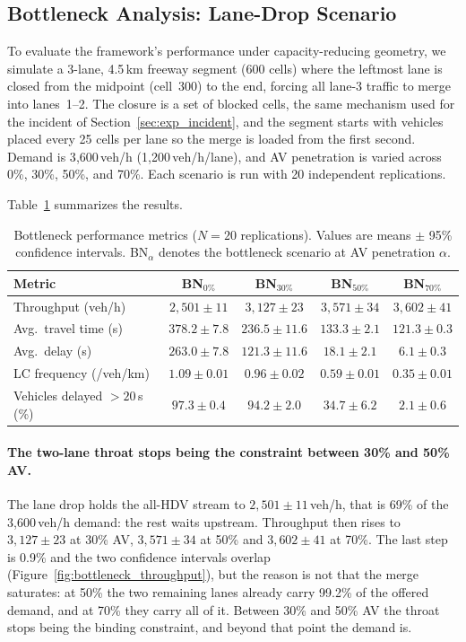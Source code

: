 \documentclass[review,authoryear]{elsarticle}
\begin{document}
\subsection{Bottleneck Analysis: Lane-Drop Scenario}
\label{sec:exp_bottleneck}

To evaluate the framework's performance under capacity-reducing geometry, we simulate a 3-lane, 4.5\,km freeway segment (600 cells) where the leftmost lane is closed from the midpoint (cell~300) to the end, forcing all lane-3 traffic to merge into lanes~1--2. The closure is a set of blocked cells, the same mechanism used for the incident of Section~\ref{sec:exp_incident}, and the segment starts with vehicles placed every 25 cells per lane so the merge is loaded from the first second. Demand is 3{,}600\,veh/h (1{,}200\,veh/h/lane), and AV penetration is varied across 0\%, 30\%, 50\%, and 70\%. Each scenario is run with 20 independent replications.

Table~\ref{tab:results_bottleneck} summarizes the results.

\begin{table}[ht]
\centering
\caption{Bottleneck performance metrics ($N = 20$ replications). Values are means $\pm$ 95\% confidence intervals. BN$_\alpha$ denotes the bottleneck scenario at AV penetration $\alpha$.}
\label{tab:results_bottleneck}
\begin{tabular}{@{}lcccc@{}}
\toprule
Metric & BN$_{0\%}$ & BN$_{30\%}$ & BN$_{50\%}$ & BN$_{70\%}$ \\
\midrule
Throughput (veh/h) & $2{,}501 \pm 11$ & $3{,}127 \pm 23$ & $3{,}571 \pm 34$ & $3{,}602 \pm 41$ \\
Avg.\ travel time (s) & $378.2 \pm 7.8$ & $236.5 \pm 11.6$ & $133.3 \pm 2.1$ & $121.3 \pm 0.3$ \\
Avg.\ delay (s) & $263.0 \pm 7.8$ & $121.3 \pm 11.6$ & $18.1 \pm 2.1$ & $6.1 \pm 0.3$ \\
LC frequency (/veh/km) & $1.09 \pm 0.01$ & $0.96 \pm 0.02$ & $0.59 \pm 0.01$ & $0.35 \pm 0.01$ \\
Vehicles delayed $>20$\,s (\%) & $97.3 \pm 0.4$ & $94.2 \pm 2.0$ & $34.7 \pm 6.2$ & $2.1 \pm 0.6$ \\
\bottomrule
\end{tabular}
\end{table}

\paragraph{The two-lane throat stops being the constraint between 30\% and 50\% AV.}
The lane drop holds the all-HDV stream to $2{,}501 \pm 11$\,veh/h, that is 69\% of the 3{,}600\,veh/h demand: the rest waits upstream. Throughput then rises to $3{,}127 \pm 23$ at 30\% AV, $3{,}571 \pm 34$ at 50\% and $3{,}602 \pm 41$ at 70\%. The last step is 0.9\% and the two confidence intervals overlap (Figure~\ref{fig:bottleneck_throughput}), but the reason is not that the merge saturates: at 50\% the two remaining lanes already carry 99.2\% of the offered demand, and at 70\% they carry all of it. Between 30\% and 50\% AV the throat stops being the binding constraint, and beyond that point the demand is.
\end{document}
